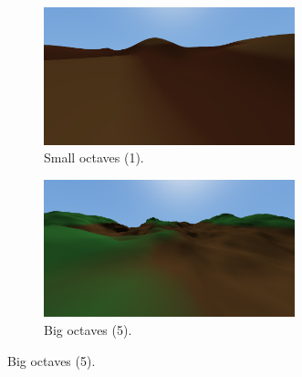 \newpage
\begin{figure}[h]
    \centering
    \begin{subfigure}{0.45\textwidth}
        \centering
        \includegraphics[width=0.8\textwidth]{chapters/implementation/sections/terrain/resources/octaves-1.png}
        \caption{Small octaves (1).}
    \end{subfigure}
    \hfill
    \begin{subfigure}{0.45\textwidth}
        \centering
        \includegraphics[width=0.8\textwidth]{chapters/implementation/sections/terrain/resources/octaves-5.png}
        \caption{Big octaves (5).}
    \end{subfigure}


\end{figure}
